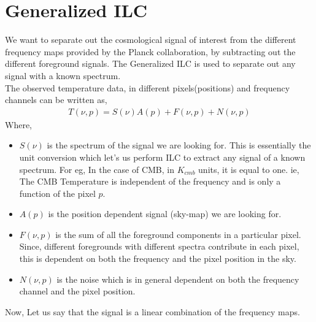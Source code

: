 \section{Generalized ILC}
We want to separate out the cosmological signal of interest from the different frequency maps provided by the Planck
collaboration, by subtracting out the different foreground signals. The Generalized ILC is used to separate out any signal with a known
spectrum.\\
The observed temperature data, in different pixels(positions) and frequency channels can be written as,
\begin{align}
  T(\nu, p) = S(\nu) A(p) + F(\nu, p) + N(\nu, p)
\end{align}
Where,
\begin{itemize}
   \item $S(\nu)$ is the spectrum of the signal we are looking for.
      This is essentially the unit conversion which let's us perform ILC to extract any signal of a known spectrum.
      For eg, In the case of CMB, in $K_{cmb}$ units, it
      is equal to one. ie, The CMB Temperature is independent of the frequency and is only a function of the pixel $p$.
   \item $A(p)$ is the position dependent signal (sky-map) we are looking for.
   \item $F(\nu, p)$ is the sum of all the foreground components in a particular pixel. Since, different foregrounds with different
      spectra contribute in each pixel, this is dependent on both the frequency and the pixel position in the sky.
   \item $N(\nu, p)$ is the noise which is in general dependent on both the frequency channel and the pixel position.
\end{itemize}

Now, Let us say that the signal is a linear combination of the frequency maps.

